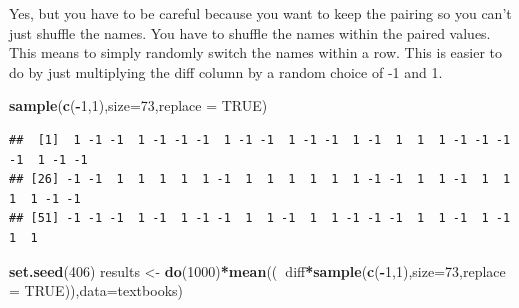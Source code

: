 \documentclass[
]{book}
\newenvironment{Shaded}{\begin{snugshade}}{\end{snugshade}}
\newcommand{\DataTypeTok}[1]{\textcolor[rgb]{0.13,0.29,0.53}{#1}}
\newcommand{\DecValTok}[1]{\textcolor[rgb]{0.00,0.00,0.81}{#1}}
\newcommand{\KeywordTok}[1]{\textcolor[rgb]{0.13,0.29,0.53}{\textbf{#1}}}
\newcommand{\NormalTok}[1]{#1}
\newcommand{\OperatorTok}[1]{\textcolor[rgb]{0.81,0.36,0.00}{\textbf{#1}}}
\newcommand{\OtherTok}[1]{\textcolor[rgb]{0.56,0.35,0.01}{#1}}
\newcommand{\StringTok}[1]{\textcolor[rgb]{0.31,0.60,0.02}{#1}}
\begin{document}
Yes, but you have to be careful because you want to keep the pairing so you can't just shuffle the names. You have to shuffle the names within the paired values. This means to simply randomly switch the names within a row. This is easier to do by just multiplying the diff column by a random choice of -1 and 1.

\begin{Shaded}
\begin{Highlighting}[]
\KeywordTok{sample}\NormalTok{(}\KeywordTok{c}\NormalTok{(}\OperatorTok{-}\DecValTok{1}\NormalTok{,}\DecValTok{1}\NormalTok{),}\DataTypeTok{size=}\DecValTok{73}\NormalTok{,}\DataTypeTok{replace =} \OtherTok{TRUE}\NormalTok{)}
\end{Highlighting}
\end{Shaded}

\begin{verbatim}
##  [1]  1 -1 -1  1 -1 -1 -1  1 -1 -1  1 -1 -1  1 -1  1  1  1 -1 -1 -1 -1  1 -1 -1
## [26] -1 -1  1  1  1  1  1 -1  1  1  1  1  1  1 -1 -1  1  1 -1  1  1  1  1 -1 -1
## [51] -1 -1 -1  1 -1  1 -1 -1  1  1 -1  1  1 -1 -1 -1  1  1 -1  1 -1  1  1
\end{verbatim}

\begin{Shaded}
\begin{Highlighting}[]
\KeywordTok{set.seed}\NormalTok{(}\DecValTok{406}\NormalTok{)}
\NormalTok{results <-}\StringTok{ }\KeywordTok{do}\NormalTok{(}\DecValTok{1000}\NormalTok{)}\OperatorTok{*}\KeywordTok{mean}\NormalTok{((}\OperatorTok{~}\NormalTok{diff}\OperatorTok{*}\KeywordTok{sample}\NormalTok{(}\KeywordTok{c}\NormalTok{(}\OperatorTok{-}\DecValTok{1}\NormalTok{,}\DecValTok{1}\NormalTok{),}\DataTypeTok{size=}\DecValTok{73}\NormalTok{,}\DataTypeTok{replace =} \OtherTok{TRUE}\NormalTok{)),}\DataTypeTok{data=}\NormalTok{textbooks)}
\end{Highlighting}
\end{Shaded}

\begin{Shaded}
\end{Shaded}
\end{document}

